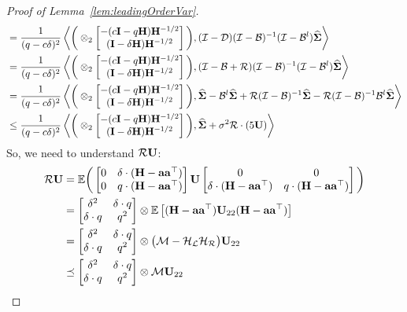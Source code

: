 \begin{proof}[Proof of Lemma~\ref{lem:leadingOrderVar}]
\begin{align}
&=\frac{1}{(q -c\delta)^2}\left\langle \bigg(\otimes_2\begin{bmatrix} -(c\mathbf{I}-q \mathbf{H})\mathbf{H}^{-1/2}\\(\mathbf{I}-\delta\mathbf{H})\mathbf{H}^{-1/2}\end{bmatrix}\bigg), (\mathcal{I}-\mathcal{D})(\mathcal{I}-\mathcal{B})^{-1}(\mathcal{I}-\mathcal{B}^l)\mathbf{\widehat{\Sigma}} \right\rangle\nonumber\\
&=\frac{1}{(q -c\delta)^2}\left\langle \bigg(\otimes_2\begin{bmatrix} -(c\mathbf{I}-q \mathbf{H})\mathbf{H}^{-1/2}\\(\mathbf{I}-\delta\mathbf{H})\mathbf{H}^{-1/2}\end{bmatrix}\bigg), (\mathcal{I}-\mathcal{B}+\mathcal{R})(\mathcal{I}-\mathcal{B})^{-1}(\mathcal{I}-\mathcal{B}^l)\mathbf{\widehat{\Sigma}} \right\rangle\nonumber\\
&=\frac{1}{(q -c\delta)^2}\left\langle \bigg(\otimes_2\begin{bmatrix} -(c\mathbf{I}-q\mathbf{H})\mathbf{H}^{-1/2}\\(\mathbf{I}-\delta\mathbf{H})\mathbf{H}^{-1/2}\end{bmatrix}\bigg), \mathbf{\widehat{\Sigma}}-\mathcal{B}^l\mathbf{\widehat{\Sigma}}+\mathcal{R}(\mathcal{I}-\mathcal{B})^{-1}\mathbf{\widehat{\Sigma}}-\mathcal{R}(\mathcal{I}-\mathcal{B})^{-1}\mathcal{B}^l\mathbf{\widehat{\Sigma}} \right\rangle\nonumber\\
&\leq\frac{1}{(q -c\delta)^2}\left\langle \bigg(\otimes_2\begin{bmatrix} -(c\mathbf{I}-q \mathbf{H})\mathbf{H}^{-1/2}\\(\mathbf{I}-\delta\mathbf{H})\mathbf{H}^{-1/2}\end{bmatrix}\bigg), \mathbf{\widehat{\Sigma}}+\sigma^2\mathcal{R}\cdot(5 \mathbf{U}) \right\rangle
\end{align}
So, we need to understand $\mathcal{R}\mathbf{U}$:
\begin{align*}
\RT\U&=\mathbb{E}\bigg( \begin{bmatrix}0 & \delta\cdot(\H-\av\av\T)\\0 & \g \cdot(\H-\av\av\T)\end{bmatrix}\U\begin{bmatrix}0 & 0\\\delta\cdot(\H-\av\av\T) & \g \cdot(\H-\av\av\T)\end{bmatrix} \bigg)\\
&=\begin{bmatrix}\delta^2&\delta\cdot \g \\\delta\cdot \g &\g ^2\end{bmatrix}\otimes \E{(\H-\av\av\T)\U_{22}(\H-\av\av\T)}\\
&=\begin{bmatrix}\delta^2&\delta\cdot \g \\\delta\cdot \g &\g ^2\end{bmatrix}\otimes \big(\M-\HL\HR\big)\U_{22}\\
&\preceq \begin{bmatrix}\delta^2&\delta\cdot \g \\\delta\cdot \g &\g ^2\end{bmatrix}\otimes \M\U_{22}\\

\end{align*}
\end{proof}

